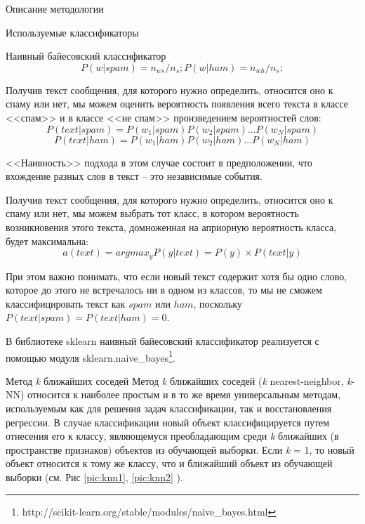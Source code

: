 \begin{section}{Описание методологии}
\begin{subsection}{Используемые классификаторы}
\begin{subsubsection}{Наивный байесовский классификатор}
\begin{equation}
  P(w|spam) = n_{ws}/n_s; P(w|ham) = n_{wh}/n_s;
\end{equation}

Получив текст сообщения, для которого нужно определить, относится оно к спаму или нет, мы можем оценить вероятность появления всего текста в классе <<спам>> и в классе <<не спам>> произведением вероятностей слов:
\begin{equation}
P(text|spam) = P(w_1|spam)P(w_2|spam)...P(w_N|spam)
\end{equation}
\begin{equation}
P(text|ham) = P(w_1|ham)P(w_2|ham)...P(w_N|ham)
\end{equation}

<<Наивность>> подхода в этом случае состоит в предположении, что вхождение разных слов в текст – это независимые события.

Получив текст сообщения, для которого нужно определить, относится оно к спаму или нет, мы можем выбрать тот класс, в котором вероятность возникновения этого текста, домноженная на априорную вероятность класса, будет максимальна:
\begin{equation}
a(text) = arg⁡max_{y}⁡ P(y|text) = P(y) \times P(text|y)
\end{equation}

При этом важно понимать, что если новый текст содержит хотя бы одно слово, которое до этого не встречалось ни в одном из классов, то мы не сможем классифицировать текст как $spam$ или $ham$, поскольку $P(text|spam) = P(text|ham) = 0$.


В библиотеке sklearn наивный байесовский классификатор реализуется с помощью модуля sklearn.naive\_bayes\footnote{http://scikit-learn.org/stable/modules/naive\_bayes.html}.


\end{subsubsection}

    \begin{subsubsection}{Метод \textit{k} ближайших соседей}
      \label{alg:knn}
      Метод \textit{k} ближайших соседей (\textit{k} nearest-neighbor, \textit{k}-NN) относится к наиболее простым и в то же время универсальным методам, используемым как для решения задач классификации, так и восстановления регрессии. В случае классификации новый объект классифицируется путем отнесения его к классу, являющемуся преобладающим среди \textit{k} ближайших (в пространстве признаков) объектов из обучающей выборки. Если \textit{k} = 1, то новый объект относится к тому же классу, что и ближайший объект из обучающей выборки (см. Рис \ref{pic:knn1}, \ref{pic:knn2} ).


\end{subsubsection}
\end{subsection}
\end{section}
